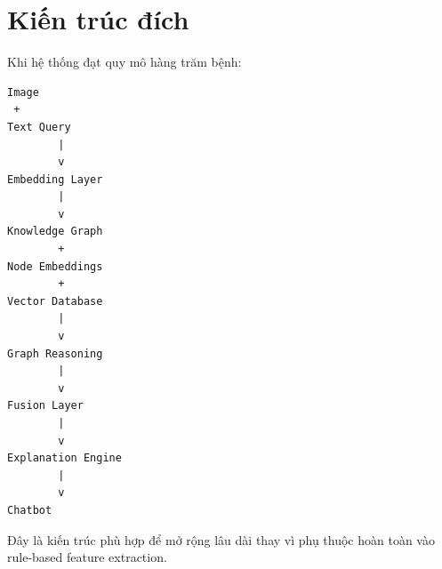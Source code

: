 \documentclass[12pt,a4paper]{article}
\begin{document}
\section{Kiến trúc đích}

Khi hệ thống đạt quy mô hàng trăm bệnh:

\begin{verbatim}
Image
 +
Text Query
        |
        v
Embedding Layer
        |
        v
Knowledge Graph
        +
Node Embeddings
        +
Vector Database
        |
        v
Graph Reasoning
        |
        v
Fusion Layer
        |
        v
Explanation Engine
        |
        v
Chatbot
\end{verbatim}

Đây là kiến trúc phù hợp để mở rộng lâu dài thay vì phụ thuộc hoàn toàn vào rule-based feature extraction.
\end{document}
